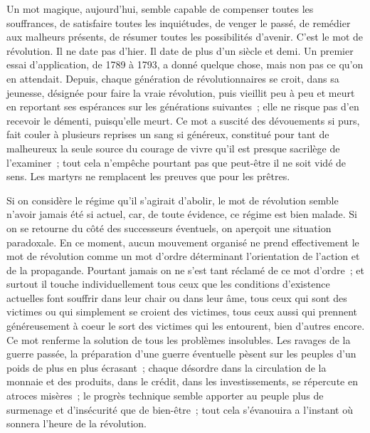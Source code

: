 \documentclass[french,twoside]{book} %
\begin{document}
\noindent \par
Un mot magique, aujourd'hui, semble capable de compenser toutes les souffrances, de satisfaire toutes les inquiétudes, de venger le passé, de remédier aux malheurs présents, de résumer toutes les possibilités d'avenir. C'est le mot de révolution. Il ne date pas d'hier. Il date de plus d'un siècle et demi. Un premier essai d'application, de 1789 à 1793, a donné quelque chose, mais non pas ce qu'on en attendait. Depuis, chaque génération de révolutionnaires se croit, dans sa jeunesse, désignée pour faire la vraie révolution, puis vieillit peu à peu et meurt en reportant ses espérances sur les générations suivantes ; elle ne risque pas d'en recevoir le démenti, puisqu'elle meurt. Ce mot a suscité des dévouements si purs, fait couler à plusieurs reprises un sang si généreux, constitué pour tant de malheureux la seule source du courage de vivre qu’il est presque sacrilège de l'examiner ; tout cela n'empêche pourtant pas que peut-être il ne soit vidé de sens. Les martyrs ne remplacent les preuves que pour les prêtres.\par
Si on considère le régime qu'il s'agirait d'abolir, le mot de révolution semble n'avoir jamais été si actuel, car, de toute évidence, ce régime est bien malade. Si on se retourne du côté des successeurs éventuels, on aperçoit une situation paradoxale. En ce moment, aucun mouvement organisé ne prend effectivement le mot de révolution comme un mot d'ordre déterminant l'orientation de l'action et de la propagande. Pourtant jamais on ne s'est tant réclamé de ce mot d'ordre ; et surtout il touche individuellement tous ceux que les conditions d'existence actuelles font souffrir dans leur chair ou dans leur âme, tous ceux qui sont des victimes ou qui simplement se croient des victimes, tous ceux aussi qui prennent généreusement à coeur le sort des victimes qui les entourent, bien d'autres encore. Ce mot renferme la solution de tous les problèmes insolubles. Les ravages de la guerre passée, la préparation d'une guerre éventuelle pèsent sur les peuples d'un poids de plus en plus écrasant ; chaque désordre dans la circulation de la monnaie et des produits, dans le crédit, dans les investissements, se répercute en atroces misères ; le progrès technique semble apporter au peuple plus de surmenage et d'insécurité que de bien-être ; tout cela s'évanouira a l'instant où sonnera l'heure de la révolution.\par
\end{document}
